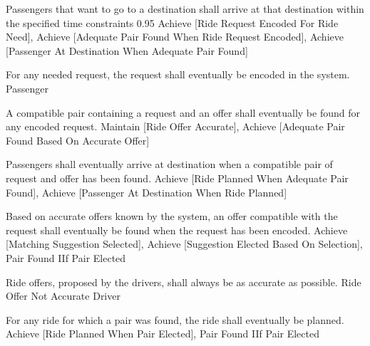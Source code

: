     {}

  \startkaosspec
  	 {Passengers that want to go to a destination shall arrive at that destination within the specified time constraints}
  	 {0.95}
  	 {Achieve [Ride Request Encoded For Ride Need], Achieve [Adequate Pair Found When Ride Request Encoded], Achieve [Passenger At Destination When Adequate Pair Found]}
  \stopkaosspec
  
  \startkaosspec
  	 {For any needed request, the request shall eventually be encoded in the system.}
  	 {Passenger}
  \stopkaosspec
  
  \startkaosspec
  	 {A compatible pair containing a request and an offer shall eventually be found for any encoded request.}
  	 {Maintain [Ride Offer Accurate], Achieve [Adequate Pair Found Based On Accurate Offer]}
  \stopkaosspec
  
  \startkaosspec
  	 {Passengers shall eventually arrive at destination when a compatible pair of request and offer has been found.}
  	 {Achieve [Ride Planned When Adequate Pair Found], Achieve [Passenger At Destination When Ride Planned]}
  \stopkaosspec
  
  \startkaosspec
  	 {Based on accurate offers known by the system, an offer compatible with the request shall eventually be found when the request has been encoded.}
  	 {Achieve [Matching Suggestion Selected], Achieve [Suggestion Elected Based On Selection], Pair Found IIf Pair Elected}
  \stopkaosspec
  
  \startkaosspec
  	 {Ride offers, proposed by the drivers, shall always be as accurate as possible.}
  	 {Ride Offer Not Accurate}
  	 {Driver}
  \stopkaosspec
  
  \startkaosspec
  	 {For any ride for which a pair was found, the ride shall eventually be planned.}
  	 {Achieve [Ride Planned When Pair Elected], Pair Found IIf Pair Elected}
  \stopkaosspec
  
